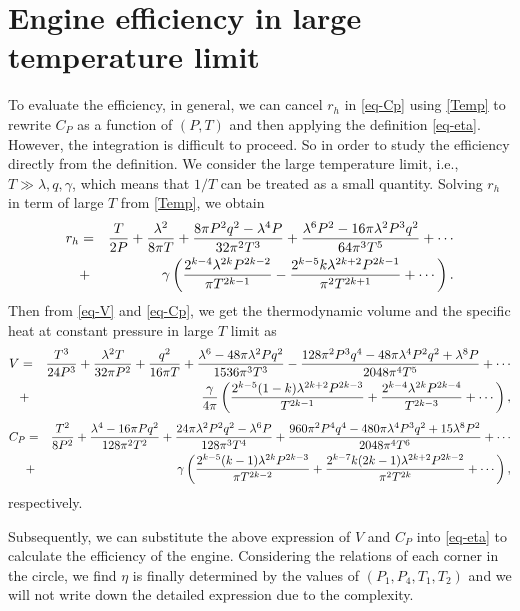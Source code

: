 \documentclass[preprint,showpacs,showkeys,onecolumn,nofootinbib]{revtex4}
\begin{document}
\section{Engine efficiency in large temperature limit}\label{sec:efficiency}
To evaluate the efficiency, in general, we can cancel $r_h$ in \eqref{eq-Cp} using \eqref{Temp} to rewrite  $C_P$ as a function of $(P,T)$ and then  applying the definition \eqref{eq-eta}. However, the integration  is difficult to proceed. So in order to study the efficiency directly from the definition. We consider the large temperature limit, i.e., $T \gg \lambda,q,\gamma$, which means that $1/T$ can be treated as a small quantity. Solving $r_h$ in term of large $T$ from \eqref{Temp}, we obtain
\begin{eqnarray}
r_h&=&\frac{T}{2 P}+\frac{\lambda ^2}{8 \pi  T}+\frac{8 \pi  P^2q^2-\lambda ^4 P}{32 \pi ^2 T^3}+\frac{\lambda ^6 P^2-16 \pi  \lambda ^2 P^3 q^2}{64 \pi ^3 T^5}+\cdots\notag\\
&+&\gamma\left(\frac{  2^{k-4} \lambda ^{2 k} P^{2 k-2} }{\pi T^{2 k-1 }}-\frac{ 2^{k-5} k \lambda ^{2 k+2} P^{2 k-1} }{\pi ^2T^{2 k+1}}+\cdots\right).
\end{eqnarray}
Then from \eqref{eq-V} and \eqref{eq-Cp}, we get the thermodynamic volume and the specific heat at constant pressure in large $T$ limit as
\begin{eqnarray}
V&=&\frac{T^3}{24 P^3}+\frac{\lambda ^2 T}{32 \pi  P^2}+\frac{q^2}{16 \pi  T}+\frac{\lambda ^6-48 \pi  \lambda ^2 P q^2}{1536 \pi ^3 T^3}-\frac{128 \pi ^2 P^3 q^4-48 \pi  \lambda^4 P^2 q^2+\lambda ^8 P}{2048 \pi ^4 T^5}+\cdots\notag\\
   &+&\frac{\gamma}{4 \pi}  \left(\frac{2^{k-5} (1-k) \lambda ^{2 k+2} P^{2 k-3}}{ T^{2 k-1}}+\frac{2^{k-4} \lambda ^{2 k} P^{2 k-4}}{ T^{2 k-3}}+\cdots\right),
\end{eqnarray}
\begin{eqnarray}
C_P&=&\frac{T^2}{8 P^2}+\frac{\lambda^4-16 \pi  P q^2}{128 \pi ^2 T^2}+\frac{24 \pi  \lambda ^2 P^2 q^2-\lambda ^6 P}{128 \pi ^3 T^4}+\frac{960 \pi ^2 P^4 q^4-480 \pi  \lambda ^4 P^3 q^2+15 \lambda ^8 P^2}{2048 \pi ^4 T^6}+\cdots\notag\\&+&\gamma  \left(\frac{2^{k-5} (k-1) \lambda ^{2 k} P^{2 k-3} }{\pi T^{2 k-2} }+\frac{2^{k-7} k (2 k-1) \lambda ^{2 k+2} P^{2 k-2} }{\pi ^2T^{2 k}}+\cdots\right),
\label{eq:4dexpansions}
\end{eqnarray}
respectively.

Subsequently, we can substitute the above expression of $V$ and $C_P$ into \eqref{eq-eta} to calculate the  efficiency of the engine. Considering the relations of each corner  in the circle, we find $\eta$ is  finally determined by the values of $(P_1,P_4, T_1,T_2)$ and we will not write  down the detailed expression due to the complexity.
\end{document}
